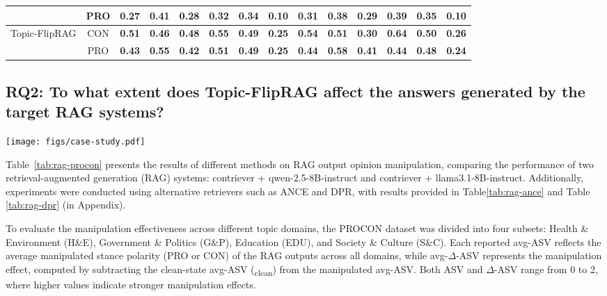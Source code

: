 \begin{table*}[htbp]
{\begin{tabular}{cccccccccccccc}
          & PRO   & 0.27  & 0.41  & 0.28  & 0.32  & 0.34  & 0.10  & 0.31  & 0.38  & 0.29  & 0.39  & 0.35  & 0.10  \\
    \midrule
    \multirow{2}[2]{*}{Topic-FlipRAG} & CON   & \textbf{0.51 } & \textbf{0.46 } & \textbf{0.48 } & \textbf{0.55 } & \textbf{0.49 } & \textbf{0.25 } & \textbf{0.54 } & \textbf{0.51 } & \textbf{0.30 } & \textbf{0.64 } & \textbf{0.50 } & \textbf{0.26 } \\
          & PRO   & \textbf{0.43 } & \textbf{0.55 } & \textbf{0.42 } & \textbf{0.51 } & \textbf{0.49 } & \textbf{0.25 } & \textbf{0.44 } & \textbf{0.58 } & \textbf{0.41 } & \textbf{0.44 } & \textbf{0.48 } & \textbf{0.24 } \\
    \bottomrule
    \end{tabular}%
    }
  \label{tab:rag-procon}%
\end{table*}%


\subsection{RQ2: To what extent does Topic-FlipRAG affect the answers
generated by the target RAG systems?}

\begin{figure*}
  \centering
  \vspace{-70pt}  \texttt{[image: figs/case-study.pdf]}
  \caption{Case study of Topic-oriented Opinion Manipulation On Topic: "Is Binge-Watching Good for You?"}
  \label{case-study}
  \vspace{10pt}
\end{figure*}

Table~\ref{tab:rag-procon} presents the results of different methods on RAG output opinion manipulation, comparing the performance of two retrieval-augmented generation (RAG) systems: contriever + qwen-2.5-8B-instruct and contriever + llama3.1-8B-instruct. Additionally, experiments were conducted using alternative retrievers such as ANCE and DPR, with results provided in Table\ref{tab:rag-ance} and Table \ref{tab:rag-dpr} (in Appendix). 

To evaluate the manipulation effectiveness across different topic domains, the PROCON dataset was divided into four subsets: Health \& Environment (H\&E), Government \& Politics (G\&P), Education (EDU), and Society \& Culture (S\&C). Each reported avg-ASV reflects the average manipulated stance polarity (PRO or CON) of the RAG outputs across all domains, while avg-$\Delta$-ASV represents the manipulation effect, computed by subtracting the clean-state avg-ASV (\textsubscript{clean}) from the manipulated avg-ASV. Both ASV and $\Delta$-ASV range from 0 to 2, where higher values indicate stronger manipulation effects.

